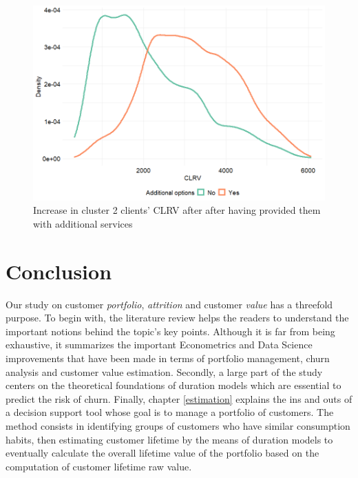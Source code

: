 \documentclass[
]{book}
\begin{document}
\begin{figure}

{\centering \includegraphics[width=12.5in]{./imgs/clust2_clrv} 

}

\caption{Increase in cluster 2 clients' CLRV after after having provided them with additional services}\label{fig:clust2CLRV}
\end{figure}

\hypertarget{conclusion}{%
\chapter*{Conclusion}\label{conclusion}}

Our study on customer \emph{portfolio}, \emph{attrition} and customer \emph{value} has a threefold purpose. To begin with, the literature review helps the readers to understand the important notions behind the topic's key points. Although it is far from being exhaustive, it summarizes the important Econometrics and Data Science improvements that have been made in terms of portfolio management, churn analysis and customer value estimation. Secondly, a large part of the study centers on the theoretical foundations of duration models which are essential to predict the risk of churn. Finally, chapter \ref{estimation} explains the ins and outs of a decision support tool whose goal is to manage a portfolio of customers. The method consists in identifying groups of customers who have similar consumption habits, then estimating customer lifetime by the means of duration models to eventually calculate the overall lifetime value of the portfolio based on the computation of customer lifetime raw value.
\end{document}

